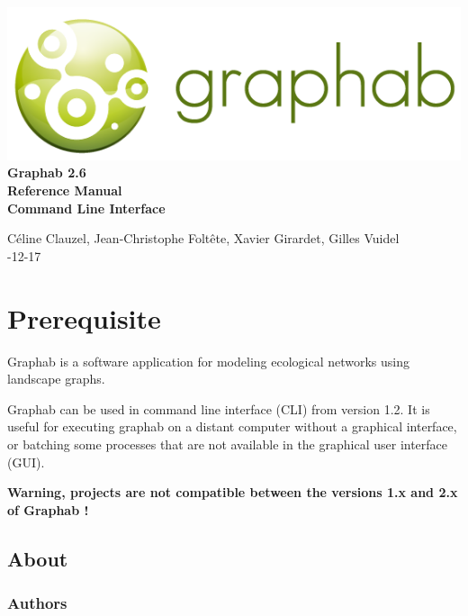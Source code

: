 \documentclass[a4paper,10pt]{report}
\begin{document}
\begin{titlepage}
	
	\centering
	\includegraphics[scale=0.5]{img/logo.png}\\
	
	\bigskip
	\bigskip
	\bigskip	
	{\Huge
		\bfseries
		Graphab 2.6\\
		\bigskip
		Reference Manual\\
		Command Line Interface\\
	}
	\bigskip
	\bigskip
	\bigskip
	\bigskip
	\bigskip
	
	{\Large		
		Céline Clauzel, Jean-Christophe Foltête, Xavier Girardet, Gilles Vuidel\\
		-12-17\\
	}
	
\end{titlepage}

\tableofcontents

\chapter{Prerequisite}
Graphab is a software application for modeling ecological networks using landscape graphs.

Graphab can be used in command line interface (CLI) from version 1.2.
It is useful for executing graphab on a distant computer without a graphical interface, or batching some processes that are not available in the graphical user interface (GUI).

\textbf{Warning, projects are not compatible between the versions 1.x and 2.x of Graphab !}

\section{About}

\subsection{Authors}
\end{document}
